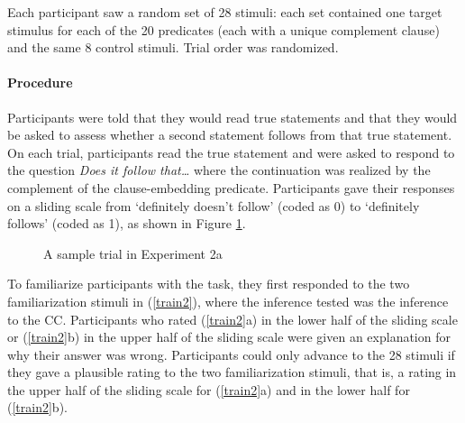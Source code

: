 \documentclass[11pt,fleqn]{article}
\newcommand{\6}{\mbox{$[\hspace*{-.6mm}[$}}
\newcommand{\9}{\mbox{$]\hspace*{-.6mm}]$}}
\begin{document}
Each participant saw a random set of 28 stimuli: each set contained one target stimulus for each of the 20 predicates (each with a unique complement clause) and the same 8 control stimuli. Trial order was randomized.

\paragraph{Procedure} Participants were told that they would read true statements and that they would be asked to assess whether a second statement follows from that true statement. On each trial, participants read the true statement and were asked to respond to the question {\em Does it follow that\ldots} where the continuation was realized by the complement of the clause-embedding predicate. Participants gave their responses on a sliding scale from `definitely doesn't follow' (coded as 0) to `definitely follows' (coded as 1), as shown in Figure \ref{f-trial-exp3}.

\begin{figure}[H]
\begin{center}
\end{center}
\caption{A sample trial in Experiment 2a}\label{f-trial-exp3}
\end{figure}

To familiarize participants with the task, they first responded to the two familiarization stimuli in (\ref{train2}), where the inference tested was the inference to the CC. Participants who rated (\ref{train2}a) in the lower half of the sliding scale or (\ref{train2}b) in the upper half of the sliding scale were given an explanation for why their answer was wrong. Participants could only advance to the 28 stimuli if they gave a plausible rating to the two familiarization stimuli, that is, a rating in the upper half of the sliding scale for (\ref{train2}a) and in the lower half for (\ref{train2}b).
\end{document}
